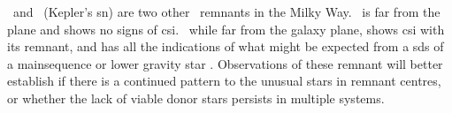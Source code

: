 \ and \ (Kepler's \gls{sn}) are two other \snia\ remnants in the Milky Way. \ is far from the plane and shows no signs of \gls{csi}. \ while far from the galaxy plane, shows \gls{csi} with its remnant, and has all the indications of what might be expected from a \gls{sds} of a \gls{mainsequence} or lower gravity star \citep{2011arXiv1103.5487C}. Observations of these remnant will better establish if there is a continued pattern to the unusual stars in \snia remnant centres, or whether the lack of viable donor stars persists in multiple systems.



